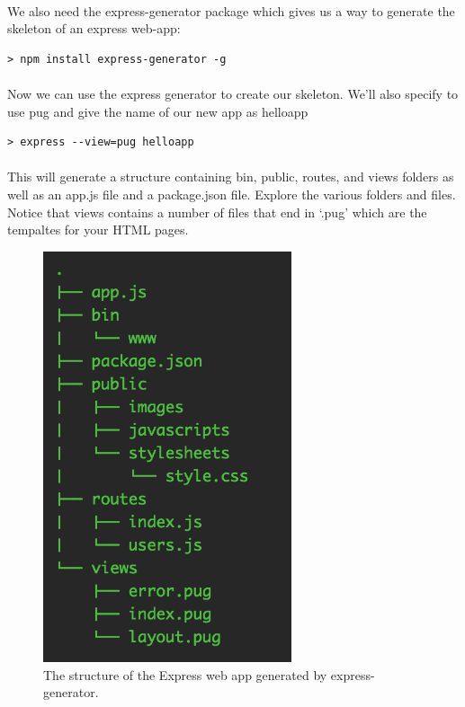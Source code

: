 \documentclass[10pt, a4paper, twosize]{article}
\begin{document}
\paragraph{} We also need the express-generator package which gives us a way to generate the skeleton of an express web-app:

\begin{lstlisting}[style=DOS]
    > npm install express-generator -g
\end{lstlisting}

\paragraph{} Now we can use the express generator to create our skeleton. We'll also specify to use pug and give the name of our new app as helloapp

\begin{lstlisting}[style=DOS]
    > express --view=pug helloapp
\end{lstlisting}

\paragraph{} This will generate a structure containing bin, public, routes, and views folders as well as an app.js file and a package.json file. Explore the various folders and files. Notice that views contains a number of files that end in `.pug' which are the tempaltes for your HTML pages. 

\begin{figure}[H]
\includegraphics[width=0.65\textwidth]{images/express_structure}
\caption{The structure of the Express web app generated by express-generator.}
\label{fig:express_structure}
\end{figure}
\end{document}
